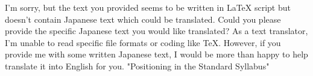 \relax
\providecommand\hyper@newdestlabel[2]{}

I'm sorry, but the text you provided seems to be written in LaTeX script but doesn't contain Japanese text which could be translated. Could you please provide the specific Japanese text you would like translated?
As a text translator, I'm unable to read specific file formats or coding like TeX. However, if you provide me with some written Japanese text, I would be more than happy to help translate it into English for you.
"Positioning in the Standard Syllabus"

